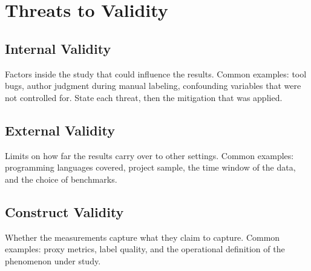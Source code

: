 \section{Threats to Validity}
 
\subsection{Internal Validity}
Factors inside the study that could influence the results. Common
examples: tool bugs, author judgment during manual labeling, confounding
variables that were not controlled for. State each threat, then the
mitigation that was applied.
 
\subsection{External Validity}
Limits on how far the results carry over to other settings. Common
examples: programming languages covered, project sample, the time
window of the data, and the choice of benchmarks.
 
\subsection{Construct Validity}
Whether the measurements capture what they claim to capture. Common
examples: proxy metrics, label quality, and the operational definition
of the phenomenon under study.
 